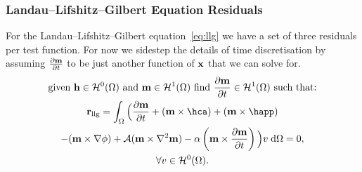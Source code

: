 


\subsubsection{Landau--Lifshitz--Gilbert Equation Residuals}

For the Landau--Lifshitz--Gilbert equation~\eqref{eq:llg} we have a set of three residuals per test function. For now we sidestep the details of time discretisation by assuming $\frac{\partial \mathbf{m}}{\partial t}$ to be just another function of $\mathbf{x}$ that we can solve for.
\begin{gather}
  \text{given $\hv \in \sob^0(\magd)$ and $\mv \in \sob^1(\magd)$ find $\dmdt \in \sob^1(\magd)$ such that:} \notag
  \\
  \mathbf{r}_{\text{llg}} = \int_\magd \Big( \dmdt
  + (\mv \times \hca) + (\mv \times \happ) \\
  - (\mv \times \nabla \phi) + \exchc(\mv \times \nabla^2 \mv)
  - \dampc \left( \mv \times \dmdt \right)
  \Big)  v \d\magd
  = 0, \label{res:contllg}
  \\
  \forall v \in \sob^0(\magd). \notag
\end{gather}

